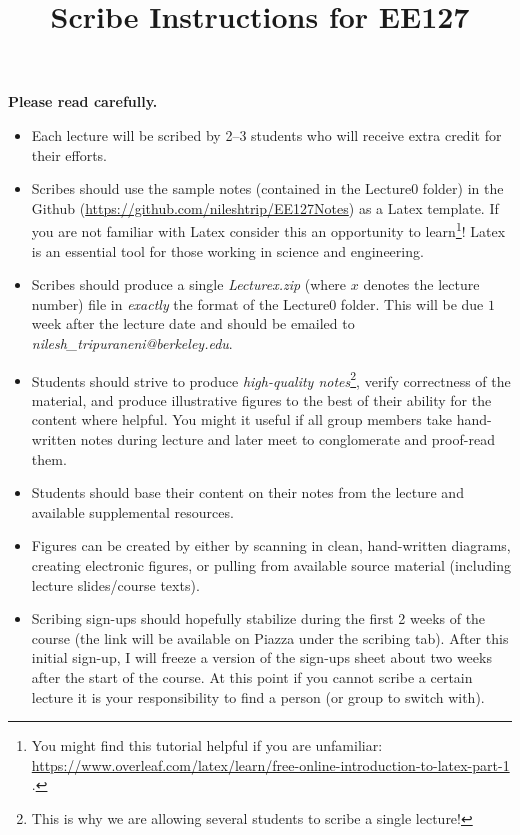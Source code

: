 \documentclass[12pt]{article}
\begin{document}
\title{Scribe Instructions for EE127}
\date{}
\maketitle

{\bf\color{red} Please read carefully.}

\begin{itemize}
\item Each lecture will be scribed by 2--3 students who will receive extra credit for their efforts.

\item Scribes should use the sample notes (contained in the Lecture0 folder) in the Github (\url{https://github.com/nileshtrip/EE127Notes}) as a Latex template. If you are not familiar with Latex consider this an opportunity to learn\footnote{You might find this tutorial helpful if you are unfamiliar: \url{https://www.overleaf.com/latex/learn/free-online-introduction-to-latex-part-1} .}! Latex is an essential tool for those working in science and engineering.

\item Scribes should produce a single \emph{Lecturex.zip} (where $x$ denotes the lecture number) file in \textit{exactly} the format of the Lecture0 folder. This will be due $1$ week after the lecture date and should be emailed to \emph{nilesh\_tripuraneni@berkeley.edu}.

\item Students should strive to produce \textit{high-quality notes}\footnote{This is why we are allowing several students to scribe a single lecture!}, verify correctness of the material, and produce illustrative figures to the best of their ability for the content where helpful. You might it useful if all group members take hand-written notes during lecture and later meet to conglomerate and proof-read them.

\item Students should base their content on their notes from the lecture and available supplemental resources.

\item Figures can be created by either by scanning in clean, hand-written diagrams, creating electronic figures, or pulling from available source material (including lecture slides/course texts).

\item Scribing sign-ups should hopefully stabilize during the first 2 weeks of the course (the link will be available on Piazza under the scribing tab). After this initial sign-up, I will freeze a version of the sign-ups sheet about two weeks after the start of the course. At this point if you cannot scribe a certain lecture it is your responsibility to find a person (or group to switch with).



\end{itemize}
\end{document}

